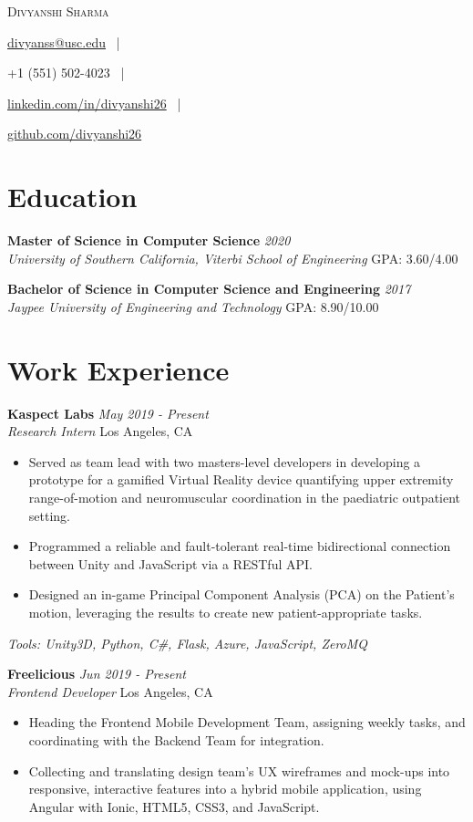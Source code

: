 \documentclass[letterpaper,10pt]{article}
\makeatletter
\newcommand{\organization}[4]{
    \vspace{1.5pt}
    \textbf{#1} \hfill{\emph{#2}} \\
    \emph{#3} \hfill{#4} \\
    \vspace{3pt}
}
\newcommand{\toolsused}[1]{
    \vspace{1.5pt}
    \emph{#1}\\
    \vspace{3pt}
}
\newcommand{\bulletsBegin}{
    \vspace{1pt}
    \begin{minipage}{17.6cm}
    \begin{itemize}[leftmargin=0.6cm]
    \setlength\itemsep{-0.1em}
}
\newcommand{\bulletsEnd}{
    \end{itemize}\vspace{0pt}
    \end{minipage}
}
\newcommand{\myEmail}[1]{
    \href{mailto:divyanss@usc.edu}{#1}
    \ |
}
\newcommand{\myPhone}[1]{
    {#1}
    \ |
}
\newcommand{\mySite}[1]{
    \href{https://linkedin.com/in/divyanshi26}{#1}
    \ |
}
\newcommand{\myGitHub}[1]{
    \href{https://github.com/divyanshi26}{#1}
}
\newcommand{\myName}[5]{
    \begin{center}
        {\huge{\color{burgundy}\scshape{#1}}} \\
        \vspace{6pt}
        \myEmail{#2}
        \myPhone{#3}
        \mySite{#4}
        \myGitHub{#5}
    \end{center}
    \vspace{-4pt}
}
\makeatother
\begin{document}
    \myName{Divyanshi Sharma}{divyanss@usc.edu}{+1 (551) 502-4023}{linkedin.com/in/divyanshi26}{github.com/divyanshi26}

    \section{Education}
        
    \organization{Master of Science in Computer Science}{2020}
        {University of Southern California, Viterbi School of Engineering}{GPA: 3.60/4.00}

	\organization{Bachelor of Science in Computer Science and Engineering}{2017}
        {Jaypee University of Engineering and Technology}{GPA: 8.90/10.00}
        \vspace{5pt}

    \section{Work Experience}

        \organization{Kaspect Labs}{May 2019 - Present}
        {Research Intern}{Los Angeles, CA}
        \bulletsBegin
            \item Served as team lead with two masters-level developers in developing a prototype for a gamified Virtual Reality device quantifying upper extremity range-of-motion and neuromuscular coordination in the paediatric outpatient setting.
            \vspace{-1pt}
            \item Programmed a reliable and fault-tolerant real-time bidirectional connection between Unity and JavaScript via a RESTful API.
            \vspace{-2pt}
            \item Designed an in-game Principal Component Analysis (PCA) on the Patient’s motion, leveraging the results to create new patient-appropriate tasks.
        \bulletsEnd
        \vspace{-5pt}
        \toolsused{Tools: Unity3D, Python, C\#, Flask, Azure, JavaScript, ZeroMQ}

        \organization{Freelicious}{Jun 2019 - Present}
        {Frontend Developer}{Los Angeles, CA}
        \bulletsBegin
            \item Heading the Frontend Mobile Development Team, assigning weekly tasks, and coordinating with the Backend Team for integration.
            \item Collecting and translating design team's UX wireframes and mock-ups into responsive, interactive features into a hybrid mobile application, using Angular with Ionic, HTML5, CSS3, and JavaScript.
        \bulletsEnd
\end{document}
